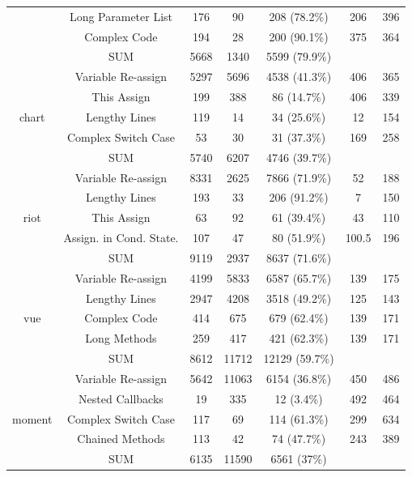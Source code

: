 \documentclass[smallcondensed]{svjour3}
\begin{document}
\begin{table}[!htbp]
{\begin{tabular}{c|c|c|c|c|c|c}
		& Long Parameter List & 176 & 90 & 208 (78.2\%) & 206 & 396 \\ \cline{2-7}
		& Complex Code & 194 & 28 & 200 (90.1\%) & 375 & 364 \\ \cline{2-7}
		& SUM & 5668 & 1340 & 5599 (79.9\%) & & \\ \hline
		\multirow{5}{*}{chart}
		& Variable Re-assign & 5297 & 5696 & 4538 (41.3\%) & 406 & 365 \\ \cline{2-7}
		& This Assign & 199 & 388 & 86 (14.7\%) & 406 & 339 \\ \cline{2-7}
		& Lengthy Lines & 119 & 14 & 34 (25.6\%) & 12 & 154 \\ \cline{2-7}
		& Complex Switch Case & 53 & 30 & 31 (37.3\%) & 169 & 258 \\ \cline{2-7}
		& SUM & 5740 & 6207 & 4746 (39.7\%) & & \\ \hline
		\multirow{5}{*}{riot}
		& Variable Re-assign & 8331 & 2625 & 7866 (71.9\%) & 52 & 188 \\ \cline{2-7}
		& Lengthy Lines & 193 & 33 & 206 (91.2\%) & 7 & 150 \\ \cline{2-7}
		& This Assign & 63 & 92 & 61 (39.4\%) & 43 & 110 \\ \cline{2-7}
		& Assign. in Cond. State. & 107 & 47 & 80 (51.9\%) & 100.5 & 196 \\ \cline{2-7}
		& SUM & 9119 & 2937 & 8637 (71.6\%) & & \\ \hline
		\multirow{5}{*}{vue}
		& Variable Re-assign & 4199 & 5833 & 6587 (65.7\%) & 139 & 175 \\ \cline{2-7}
		& Lengthy Lines & 2947 & 4208 & 3518 (49.2\%) & 125 & 143 \\ \cline{2-7}
		& Complex Code & 414 & 675 & 679 (62.4\%) & 139 & 171 \\ \cline{2-7}
		& Long Methods & 259 & 417 & 421 (62.3\%) & 139 & 171 \\ \cline{2-7}
		& SUM & 8612 & 11712 & 12129 (59.7\%) & & \\ \hline
		\multirow{5}{*}{moment}
		& Variable Re-assign & 5642 & 11063 & 6154 (36.8\%) & 450 & 486 \\ \cline{2-7}
		& Nested Callbacks & 19 & 335 & 12 (3.4\%) & 492 & 464 \\ \cline{2-7}
		& Complex Switch Case & 117 & 69 & 114 (61.3\%) & 299 & 634 \\ \cline{2-7}
		& Chained Methods & 113 & 42 & 74 (47.7\%) & 243 & 389 \\ \cline{2-7}
		& SUM & 6135 & 11590 & 6561 (37\%) & & \\ \hline

\end{tabular}}
\end{table}
\end{document}

